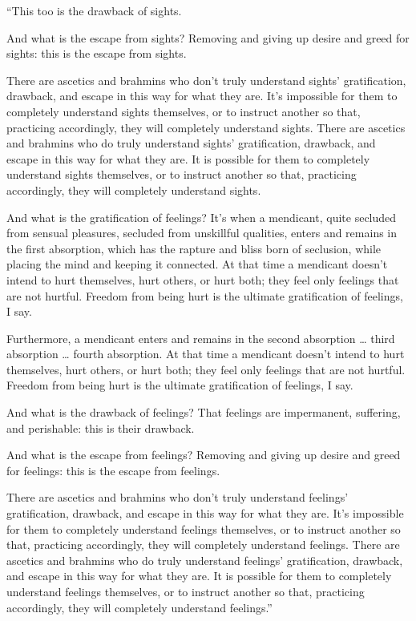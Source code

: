 \documentclass[12pt,openany]{book}%
\begin{document}
“This too is the drawback of sights. 

And what is the escape from sights? Removing and giving up desire and greed for sights: this is the escape from sights. 

There are ascetics and brahmins who don’t truly understand sights’ gratification, drawback, and escape in this way for what they are. It’s impossible for them to completely understand sights themselves, or to instruct another so that, practicing accordingly, they will completely understand sights. There are ascetics and brahmins who do truly understand sights’ gratification, drawback, and escape in this way for what they are. It is possible for them to completely understand sights themselves, or to instruct another so that, practicing accordingly, they will completely understand sights. 

And what is the gratification of feelings? It’s when a mendicant, quite secluded from sensual pleasures, secluded from unskillful qualities, enters and remains in the first absorption, which has the rapture and bliss born of seclusion, while placing the mind and keeping it connected. At that time a mendicant doesn’t intend to hurt themselves, hurt others, or hurt both; they feel only feelings that are not hurtful. Freedom from being hurt is the ultimate gratification of feelings, I say. 

Furthermore, a mendicant enters and remains in the second absorption … third absorption … fourth absorption. At that time a mendicant doesn’t intend to hurt themselves, hurt others, or hurt both; they feel only feelings that are not hurtful. Freedom from being hurt is the ultimate gratification of feelings, I say. 

And what is the drawback of feelings? That feelings are impermanent, suffering, and perishable: this is their drawback. 

And what is the escape from feelings? Removing and giving up desire and greed for feelings: this is the escape from feelings. 

There are ascetics and brahmins who don’t truly understand feelings’ gratification, drawback, and escape in this way for what they are. It’s impossible for them to completely understand feelings themselves, or to instruct another so that, practicing accordingly, they will completely understand feelings. There are ascetics and brahmins who do truly understand feelings’ gratification, drawback, and escape in this way for what they are. It is possible for them to completely understand feelings themselves, or to instruct another so that, practicing accordingly, they will completely understand feelings.” 
\end{document}

